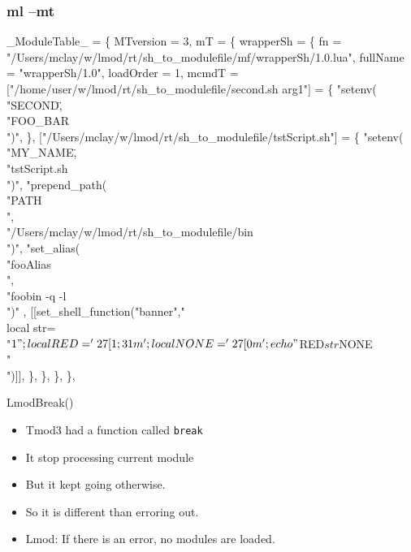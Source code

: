 \documentclass{beamer}
\begin{document}
\begin{frame}[fragile]
  \frametitle{ml --mt}
    {\tiny
\begin{semiverbatim}
\_ModuleTable\_ = \{
  MTversion = 3,
  mT = \{
    wrapperSh = \{
      fn = "/Users/mclay/w/lmod/rt/sh_to_modulefile/mf/wrapperSh/1.0.lua",
      fullName = "wrapperSh/1.0",
      loadOrder = 1,
      mcmdT = {
        ["/home/user/w/lmod/rt/sh_to_modulefile/second.sh arg1"] = \{
          "setenv(\\"SECOND\",\\"FOO_BAR\\")",
        \},
        ["/Users/mclay/w/lmod/rt/sh_to_modulefile/tstScript.sh"] = \{
          "setenv(\\"MY_NAME\",\\"tstScript.sh\\")",
          "prepend_path(\\"PATH\\",\\"/Users/mclay/w/lmod/rt/sh_to_modulefile/bin\\")",
          "set_alias(\\"fooAlias\\",\\"foobin -q -l\\")"
          , [[set_shell_function("banner"," \\
    local str=\\"$1\\";\\
    local RED='\\27[1;31m';\\
    local NONE='\\27[0m';\\
    echo \\"${RED}${str}${NONE}\\"\\
")]], 
        \},
      \},
    \},
  \},
}
\end{semiverbatim}
    }
\end{frame}

\begin{frame}{LmodBreak()}
  \begin{itemize}
    \item Tmod3 had a function called \texttt{break}
    \item It stop processing current module
    \item But it kept going otherwise.
    \item So it is different than erroring out.
    \item Lmod: If there is an error, no modules are loaded.
  \end{itemize}
\end{frame}
\end{document}
